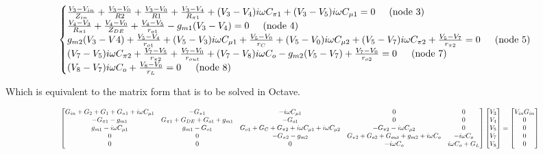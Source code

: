 \begin{equation}
    \begin{cases}
        \frac{V_3-V_{in}}{Z_{in}}+\frac{V_3-V_0}{R2}+\frac{V_3-V_0}{R1}+\frac{V_3-V_4}{R_{\pi1}}+(V_3-V_4)i \omega C_{\pi1}+(V_3-V_5)i \omega C_{\mu1}=0 \hspace{5mm}\text{(node 3)}\\
        \frac{V_4-V_3}{R_{\pi1}}+\frac{V_4-V_0}{Z_{DE}}+\frac{V_4-V_5}{r_{o1}}-g_{m1}(V_3-V_4)=0 \hspace{5mm}\text{(node 4)}\\
        g_{m2}(V_3-V4)+\frac{V_5-V_4}{r_{o1}}+(V_5-V_3)i \omega C_{\mu1}+\frac{V_5-V_0}{r_{C}}+(V_5-V_0)i \omega C_{\mu2}+(V_5-V_7)i \omega C_{\pi2}+\frac{V_5-V_7}{r_{\pi2}}  = 0 \hspace{15px}\text{(node 5)}\\
        (V_7-V_5)i \omega C_{\pi2}+\frac{V_7-V_5}{r_{\pi2}}+\frac{V_7-V_0}{r_{out}}+(V_7-V_8)i \omega C_o -g_{m2}(V_5-V_7)+\frac{V_7-V_0}{r_{o2}}  = 0 \hspace{15px}\text{(node 7)}\\
        (V_8-V_7)i \omega C_o+\frac{V_8-V_0}{r_{L}}  = 0 \hspace{15px}\text{(node 8)}\\
    \end{cases}
\end{equation}

Which is equivalent to the matrix form that is to be solved in Octave.

\begin{equation}
\scalemath{0.7}{
    \begin{bmatrix}
     G_{in}+G_2+G_1+G_{\pi1}+i\omega C_{\mu1} &  -G_{\pi1}      &  -i\omega C_{\mu1} &    0  &     0      \\
     -G_{\pi1}-g_{m1} & G_{\pi1}+G_{DE}+G_{o1}+g_{m1} & -G_{o1}  & 0   &  0      \\
     g_{m1}-i\omega C_{\mu1}   & g_{m1}-G_{o1}    & G_{o1}+G_C+G_{\pi2}+i\omega C_{\mu1}+i\omega C_{\mu2}  &  -G_{\pi2}-i\omega C_{\mu2}   &   0       \\
     0   & 0        & -G_{\pi2}-g_{m2}   & G_{\pi2}+G_{o2}+G_{out}+g_{m2}+i\omega C_{o} & -i\omega C_{o}      \\
     0   &  0      &  0 &  -i\omega C_{o}  &   i\omega C_{o}+G_L\\
    \end{bmatrix} 
    \begin{bmatrix}
        V_3\\
       V_4\\
        V_5\\
        V_7\\
        V_8\\
    \end{bmatrix}
    =
    \begin{bmatrix}
        V_{in}G_{in}\\
        0\\
        0\\
        0\\
        0
    \end{bmatrix}}
\label{matrix_octave_incremental}
\end{equation}